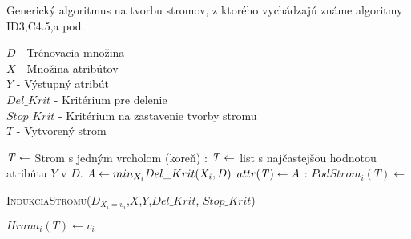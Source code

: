 \begin{algorithm} 
\caption{Generický algoritmus na tvorbu stromov, z ktorého vychádzajú známe algoritmy ID3,C4.5,a pod.}\label{fig:genericAlgoritm}
$D$ - Trénovacia množina \\
$X$ - Množina atribútov \\
$Y$ - Výstupný atribút \\
$Del\_Krit$ - Kritérium pre delenie \\
$Stop\_Krit$ - Kritérium na zastavenie tvorby stromu \\
$T$ - Vytvorený strom 
\begin{algorithmic}
\State $\mathit{T} \gets $ Strom s jedným vrcholom (koreň)
:	  
\State $\mathit{T} \gets $ list s najčastejšou hodnotou atribútu $Y$ v $D$.
\Else
\State $\mathit{A} \gets min_{X_{i}}Del\_Krit(X_{i},D)$
\State $attr(\mathit{T}) \gets A$
\EndIf
{}:
\State $PodStrom_{i}(T) \gets $ \parbox[t]{280pt}{\textsc{IndukciaStromu}($D_{X_{i} = v_{i}}$,$X$,$Y$,$Del\_Krit$, $Stop\_Krit$)} 
\State $Hrana_{i}(T) \gets v_{i}$  
\EndFor \\
\EndFunction
\end{algorithmic}
\end{algorithm}

%

